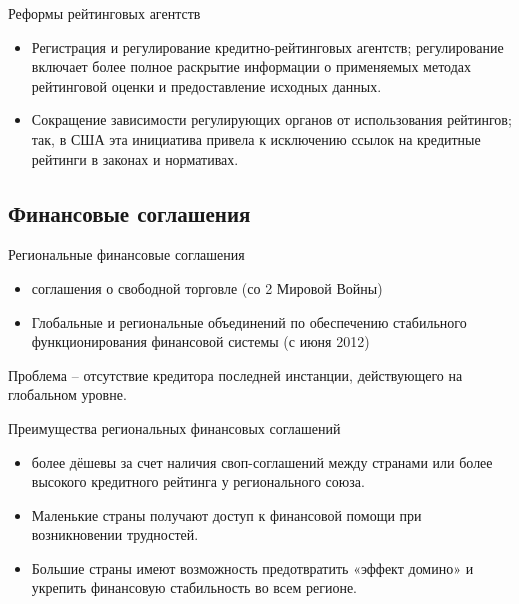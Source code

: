 \documentclass[_Banking_p1.tex]{subfiles}
\begin{document}
\begin{frame}{Реформы рейтинговых агентств}
\begin{itemize}[<+->]
\item
Регистрация и регулирование кредитно-рейтинговых агентств; регулирование включает более полное раскрытие информации о применяемых методах рейтинговой оценки и предоставление исходных данных.

\item
Сокращение зависимости регулирующих органов от использования рейтингов; так, в США эта инициатива привела к исключению ссылок на кредитные рейтинги в законах и нормативах.

\end{itemize}

\end{frame}

\subsection{Финансовые соглашения}
\begin{frame}{Региональные финансовые соглашения}
\begin{itemize}[<+->]

\item
соглашения о свободной торговле (со 2 Мировой Войны)

\item
Глобальные и региональные объединений по обеспечению стабильного функционирования финансовой системы (с июня 2012)

\end{itemize}
Проблема – отсутствие кредитора последней инстанции, действующего на глобальном уровне.

\end{frame}

\begin{frame}{Преимущества региональных финансовых соглашений}
\begin{itemize}[<+->]

\item
более дёшевы за счет наличия своп-соглашений между странами или более высокого кредитного рейтинга у регионального союза.

\item
Маленькие страны получают доступ к финансовой помощи при возникновении трудностей.

\item
Большие страны имеют возможность предотвратить «эффект домино» и укрепить финансовую стабильность во всем регионе.
\end{itemize}

\end{frame}
\end{document}
